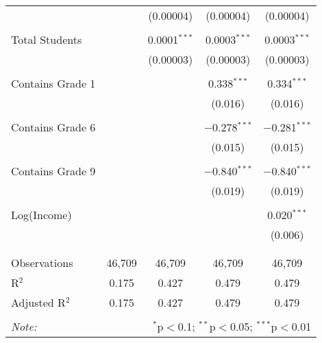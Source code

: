 \begin{table}[!htbp]
\begin{tabular}{@{\extracolsep{-2pt}}lcccc}
  &  & (0.00004) & (0.00004) & (0.00004) \\ 
  & & & & \\ 
 Total Students &  & 0.0001$^{***}$ & 0.0003$^{***}$ & 0.0003$^{***}$ \\ 
  &  & (0.00003) & (0.00003) & (0.00003) \\ 
  & & & & \\ 
 Contains Grade 1 &  &  & 0.338$^{***}$ & 0.334$^{***}$ \\ 
  &  &  & (0.016) & (0.016) \\ 
  & & & & \\ 
 Contains Grade 6 &  &  & $-$0.278$^{***}$ & $-$0.281$^{***}$ \\ 
  &  &  & (0.015) & (0.015) \\ 
  & & & & \\ 
 Contains Grade 9 &  &  & $-$0.840$^{***}$ & $-$0.840$^{***}$ \\ 
  &  &  & (0.019) & (0.019) \\ 
  & & & & \\ 
 Log(Income) &  &  &  & 0.020$^{***}$ \\ 
  &  &  &  & (0.006) \\ 
  & & & & \\ 
\hline \\[-1.8ex] 
Observations & 46,709 & 46,709 & 46,709 & 46,709 \\ 
R$^{2}$ & 0.175 & 0.427 & 0.479 & 0.479 \\ 
Adjusted R$^{2}$ & 0.175 & 0.427 & 0.479 & 0.479 \\ 
\hline 
\hline \\[-1.8ex] 
\textit{Note:}  & \multicolumn{4}{r}{$^{*}$p$<$0.1; $^{**}$p$<$0.05; $^{***}$p$<$0.01} \\ 
\end{tabular} 
\end{table} 
